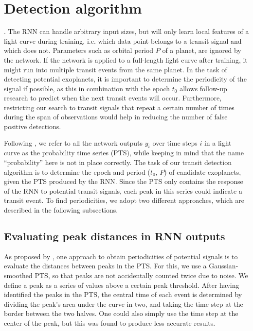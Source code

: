 
\section{Detection algorithm}

. The RNN can handle arbitrary input sizes, but will only learn local features of a light curve during training, i.e. which data point belongs to a transit signal and which does not. Parameters such as orbital period $P$ of a planet, are ignored by the network. If the network is applied to a full-length light curve after training, it might run into multiple transit events from the same planet. In the task of detecting potential exoplanets, it is important to determine the periodicity of the signal if possible, as this in combination with the epoch $t_0$ allows follow-up research to predict when the next transit events will occur. Furthermore, restricting our search to transit signals that repeat a certain number of times during the span of observations would help in reducing the number of false positive detections.

Following \cite{pearson2018searching}, we refer to all the network outputs $y_i$ over time steps $i$ in a light curve as the probability time series (PTS), while keeping in mind that the name ``probability'' here is not in place correctly. The task of our transit detection algorithm is to determine the epoch and period ($t_0$, $P$) of candidate exoplanets, given the PTS produced by the RNN. Since the PTS only contains the response of the RNN to potential transit signals, each peak in this series could indicate a transit event. To find periodicities, we adopt two different approaches, which are described in the following subsections. 

\subsection{Evaluating peak distances in RNN outputs}
\label{sec:alg_peaks}

As proposed by \cite{pearson2018searching}, one approach to obtain periodicities of potential signals is to evaluate the distances between peaks in the PTS. For this, we use a Gaussian-smoothed PTS, so that peaks are not accidentally counted twice due to noise. We define a peak as a series of values above a certain peak threshold. After having identified the peaks in the PTS, the central time of each event is determined by dividing the peak's area under the curve in two, and taking the time step at the border between the two halves. One could also simply use the time step at the center of the peak, but this was found to produce less accurate results. 

